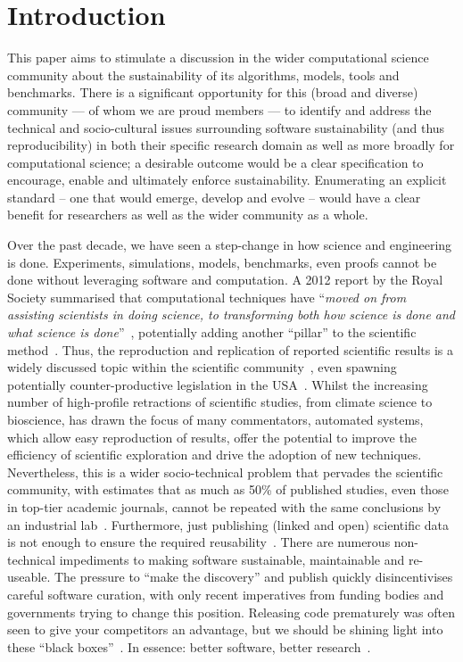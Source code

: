 \documentclass[conference]{IEEEtran}
\begin{document}
\section{Introduction}

This paper aims to stimulate a discussion in the wider computational
science community about the sustainability of its algorithms, models,
tools and benchmarks. There is a significant opportunity for this
(broad and diverse) community --- of whom we are proud members --- to
identify and address the technical and socio-cultural issues
surrounding software sustainability (and thus reproducibility) in both
their specific research domain as well as more broadly for
computational science; a desirable outcome would be a clear
specification to encourage, enable and ultimately enforce
sustainability. Enumerating an explicit standard -- one that would emerge,
develop and evolve -- would have a clear benefit for researchers as
well as the wider community as a whole.

Over the past decade, we have seen a step-change in how science and
engineering is done. Experiments, simulations, models, benchmarks,
even proofs cannot be done without leveraging software and
computation. A 2012 report by the Royal Society summarised that
computational techniques have ``{\emph{moved on from assisting
scientists in doing science, to transforming both how science is done
and what science is done}}''~\cite{rssaaoe:2012}, potentially adding
another ``pillar'' to the scientific
method~\cite{hey:2009,vardi-cacm-2010}. Thus, the reproduction and
replication of reported scientific results is a widely discussed topic
within the scientific
community~\cite{schwab-et-al:2000,barnes:2010,mesirov:2010,morin-et-al:2012,joppa-et-al:2013},
even spawning potentially counter-productive legislation in the
USA~\cite{hr4012:2014}.  Whilst the increasing number of high-profile
retractions of scientific studies, from climate science to bioscience,
has drawn the focus of many commentators, automated systems, which
allow easy reproduction of results, offer the potential to improve the
efficiency of scientific exploration and drive the adoption of new
techniques. Nevertheless, this is a wider socio-technical problem that
pervades the scientific community, with estimates that as much as 50\%
of published studies, even those in top-tier academic journals, cannot
be repeated with the same conclusions by an industrial
lab~\cite{osherovich:2011}. Furthermore, just publishing (linked and
open) scientific data is not enough to ensure the required
reusability~\cite{bechhofer-et-al:2013}. There are numerous
non-technical impediments to making software sustainable, maintainable
and re-useable. The pressure to ``make the discovery'' and publish
quickly disincentivises careful software curation, with only recent
imperatives from funding bodies and governments trying to change this
position. Releasing code prematurely was often seen to give your
competitors an advantage, but we should be shining light into these
``black boxes''~\cite{morin-et-al:2012}. In essence: better software,
better research~\cite{goble:2014}.
\end{document}
